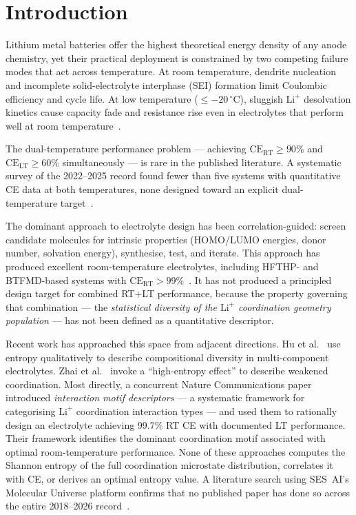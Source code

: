 \documentclass[12pt,letterpaper]{article}
\begin{document}
\newpage
\tableofcontents
\newpage

\section{Introduction}
\label{sec:intro}

Lithium metal batteries offer the highest theoretical energy
density of any anode chemistry, yet their practical deployment
is constrained by two competing failure modes that act across
temperature.
At room temperature, dendrite nucleation and incomplete
solid-electrolyte interphase (SEI) formation limit
Coulombic efficiency and cycle life.
At low temperature ($\leq -20\,^{\circ}\mathrm{C}$),
sluggish $\mathrm{Li}^{+}$ desolvation kinetics cause
capacity fade and resistance rise even in electrolytes
that perform well at room temperature~\cite{holoubek2022,fan2023}.

The dual-temperature performance problem --- achieving
$\mathrm{CE}_{\mathrm{RT}} \geq 90\%$ and
$\mathrm{CE}_{\mathrm{LT}} \geq 60\%$ simultaneously
--- is rare in the published literature.
A systematic survey of the 2022--2025 record found fewer
than five systems with quantitative CE data at both
temperatures, none designed toward an explicit
dual-temperature target~\cite{hu2025,zhai2025,
natcomm2025motif,natenergy2023hee}.

The dominant approach to electrolyte design has been
correlation-guided: screen candidate molecules for intrinsic
properties (HOMO/LUMO energies, donor number, solvation
energy), synthesise, test, and iterate.
This approach has produced excellent room-temperature
electrolytes, including HFTHP- and BTFMD-based systems
with $\mathrm{CE}_{\mathrm{RT}} > 99\%$~\cite{lee2024btfmd}.
It has not produced a principled design target for combined
RT$+$LT performance, because the property governing that
combination --- the \textit{statistical diversity of the
$\mathrm{Li}^{+}$ coordination geometry population} ---
has not been defined as a quantitative descriptor.

Recent work has approached this space from adjacent
directions.
Hu et al.~\cite{hu2025} use entropy qualitatively to
describe compositional diversity in multi-component
electrolytes.
Zhai et al.~\cite{zhai2025} invoke a ``high-entropy
effect'' to describe weakened coordination.
Most directly, a concurrent Nature Communications
paper~\cite{natcomm2025motif} introduced
\textit{interaction motif descriptors} --- a systematic
framework for categorising $\mathrm{Li}^{+}$ coordination
interaction types --- and used them to rationally design
an electrolyte achieving 99.7\% RT CE with documented LT
performance.
Their framework identifies the dominant coordination motif
associated with optimal room-temperature performance.
None of these approaches computes the Shannon entropy of
the full coordination microstate distribution, correlates
it with CE, or derives an optimal entropy value.
A literature search using SES~AI's Molecular Universe
platform confirms that no published paper has done so
across the entire 2018--2026
record~\cite{mu2026query5}.
\end{document}

